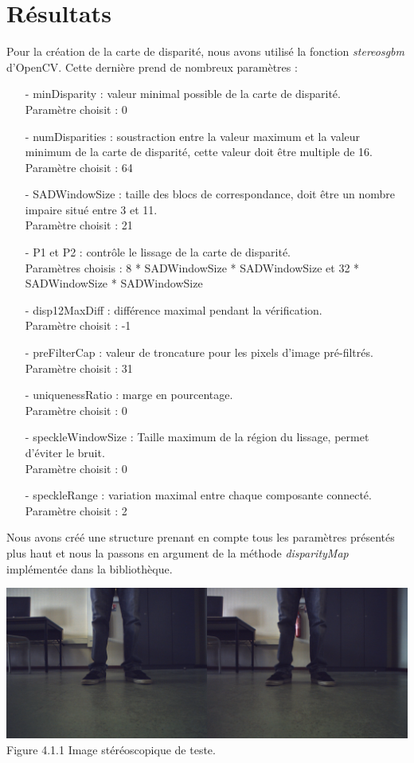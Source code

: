 \documentclass[12pt,a4paper]{report}
\begin{document}
\section{Résultats}
Pour la création de la carte de disparité, nous avons utilisé la fonction \textit{stereosgbm} d'OpenCV. Cette dernière prend de nombreux paramètres : 
\begin{enumerate}
\item[-] minDisparity : valeur minimal possible de la carte de disparité.\\
Paramètre choisit : 0
\item[-] numDisparities : soustraction entre la valeur maximum et la valeur minimum de la carte de disparité, cette valeur doit être multiple de 16.\\
Paramètre choisit : 64
\item[-] SADWindowSize : taille des blocs de correspondance, doit être un nombre impaire situé entre 3 et 11.\\
Paramètre choisit : 21
\item[-] P1 et P2 : contrôle le lissage de la carte de disparité.\\
Paramètres choisis : 8 * SADWindowSize * SADWindowSize et 32 * SADWindowSize * SADWindowSize
\item[-] disp12MaxDiff : différence maximal pendant la vérification.\\
Paramètre choisit : -1
\item[-] preFilterCap : valeur de troncature pour les pixels d'image pré-filtrés.\\
Paramètre choisit : 31
\item[-] uniquenessRatio : marge en pourcentage.\\
Paramètre choisit : 0
\item[-] speckleWindowSize : Taille maximum de la région du lissage, permet d'éviter le bruit.\\
Paramètre choisit : 0
\item[-] speckleRange : variation maximal entre chaque composante connecté.
Paramètre choisit : 2
\end{enumerate}

Nous avons créé une structure prenant en compte tous les paramètres présentés plus haut et nous la passons en argument de la méthode \textit{disparityMap} implémentée dans la bibliothèque.\\

\begin{center}
		\includegraphics[scale=0.32]{img_0.png}\\
		Figure 4.1.1 Image stéréoscopique de teste.
\end{center}
\end{document}
